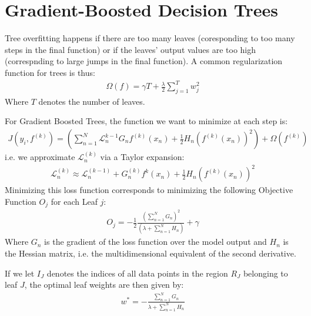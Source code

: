 \documentclass{report}
\newcommand*{\newpar}{\par\vspace{\baselineskip}\noindent}
\newcommand{\loss}{\mathcal{L}}
\begin{document}
\section{Gradient-Boosted Decision Trees}
Tree overfitting happens if there are too many leaves (coresponding to too many steps in the final function) or if the leaves' output values are too high (correspnding to large jumps in the final function). A common regularization function for trees is thus:
\begin{align}
 \Omega(f) = \gamma T + \frac{\lambda}{2}\sum_{j=1}^T w_j^2
\end{align}
Where $T$ denotes the number of leaves.
\newpar
For Gradient Boosted Trees, the function we want to minimize at each step is:
\begin{align}
 J(y_i, f^{(k)}) = \left(\sum_{n=1}^N \loss_n^{k-1} G_n f^{(k)}(x_n) + \frac{1}{2} H_n (f^{(k)}(x_n))^2\right) + \Omega(f^{(k)})
\end{align}
i.e. we approximate $\loss_n^{(k)}$ via a Taylor expansion:
\begin{align}
 \loss_n^{(k)} \approx \loss_n^{(k-1)} +  G_n^{(k)}f^{k}(x_n) + \frac{1}{2}H_n(f^{(k)}(x_n))^2
\end{align}
Minimizing this loss function corresponds to minimizing the following Objective Function $O_j$ for each Leaf $j$:
\begin{align}
 O_j = - \frac{1}{2}\frac{\left(\sum_{n=1}^N G_n\right)^2}{\left(\lambda + \sum_{n=1}^N H_n\right)} + \gamma
\end{align}
Where $G_n$ is the gradient of the loss function over the model output and $H_n$ is the Hessian matrix, i.e. the multidimensional equivalent of the second derivative.
\newpar
If we let $I_J$ denotes the indices of all data points in the region $R_J$ belonging to leaf $J$, the optimal leaf weights are then given by:
\begin{align}
 w^* = - \frac{\sum_{n=1}^N G_n}{\lambda + \sum_{n=1}^N H_n}
\end{align}
\end{document}
